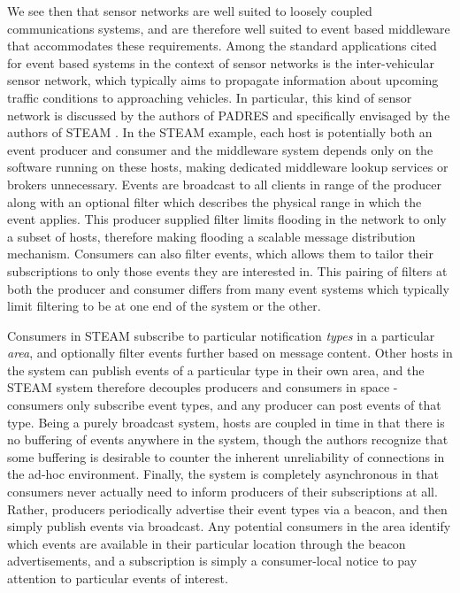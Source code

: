 \documentclass{acm_proc_article-sp}
\begin{document}
We see then that sensor networks are well suited to loosely coupled communications systems, and are therefore well suited to event based middleware that accommodates these requirements. Among the standard applications cited for event based systems in the context of sensor networks is the inter-vehicular sensor network, which typically aims to propagate information about upcoming traffic conditions to approaching vehicles. In particular, this kind of sensor network is discussed by the authors of PADRES \cite{Jacobsen:2010p8313} and specifically envisaged by the authors of STEAM \cite{Meier:2002p8380}. In the STEAM example, each host is potentially both an event producer and consumer and the middleware system depends only on the software running on these hosts, making dedicated middleware lookup services or brokers unnecessary. Events are broadcast to all clients in range of the producer along with an optional filter which describes the physical range in which the event applies. This producer supplied filter limits flooding in the network to only a subset of hosts, therefore making flooding a scalable message distribution mechanism. Consumers can also filter events, which allows them to tailor their subscriptions to only those events they are interested in. This pairing of filters at both the producer and consumer differs from many event systems which typically limit filtering to be at one end of the system or the other. 

Consumers in STEAM subscribe to particular notification {\em types} in a particular {\em area}, and optionally filter events further based on message content. Other hosts in the system can publish events of a particular type in their own area, and the STEAM system therefore decouples producers and consumers in space - consumers only subscribe event types, and any producer can post events of that type. Being a purely broadcast system, hosts are coupled in time in that there is no buffering of events anywhere in the system, though the authors recognize that some buffering is desirable to counter the inherent unreliability of connections in the ad-hoc environment. Finally, the system is completely asynchronous in that consumers never actually need to inform producers of their subscriptions at all. Rather, producers periodically advertise their event types via a beacon, and then simply publish events via broadcast. Any potential consumers in the area identify which events are available in their particular location through the beacon advertisements, and a subscription is simply a consumer-local notice to pay attention to particular events of interest. 
\end{document}
